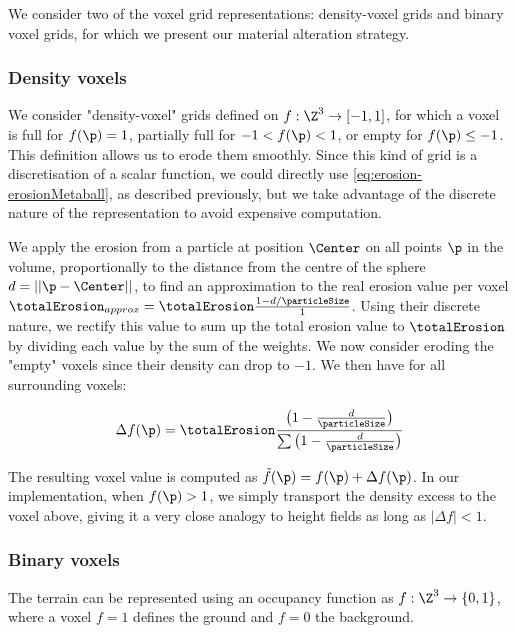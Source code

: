 We consider two of the voxel grid representations: density-voxel grids and binary voxel grids, for which we present our material alteration strategy.

\subsubsection{Density voxels}
\label{sec:erosion-application_on_density_voxels}

We consider "density-voxel" grids defined on $f: \Z^3 \to [-1, 1]$, for which a voxel is full for $f(\p) = 1$, partially full for $-1 < f(\p) < 1$, or empty for $f(\p) \leq -1$.  
This definition allows us to erode them smoothly.  
Since this kind of grid is a discretisation of a scalar function, we could directly use \cref{eq:erosion-erosionMetaball}, as described previously, but we take advantage of the discrete nature of the representation to avoid expensive computation. 

We apply the erosion from a particle at position $\Center$ on all points $\p$ in the volume, proportionally to the distance from the centre of the sphere $d = ||\p - \Center||$, to find an approximation to the real erosion value per voxel $\totalErosion_{approx} = \totalErosion \frac{1 - d/\particleSize}{1}$.  
Using their discrete nature, we rectify this value to sum up the total erosion value to $\totalErosion$ by dividing each value by the sum of the weights. We now consider eroding the "empty" voxels since their density can drop to $-1$. We then have for all surrounding voxels: 

\begin{align}
    \label{eq:erosion-erosionVoxels}
    \Delta f(\p) = \totalErosion \frac{ \big(1 - \frac{d}{\particleSize} \big)}{ \sum \big(1 - \frac{d}{\particleSize}\big)}
\end{align}

The resulting voxel value is computed as $\Tilde{f}(\p) = f(\p) + \Delta f(\p)$.  
In our implementation, when $f(\p) > 1$, we simply transport the density excess to the voxel above, giving it a very close analogy to height fields as long as $|\Delta f| < 1$. 

\subsubsection{Binary voxels}
\label{sec:erosion-application_on_binary_voxels}

The terrain can be represented using an occupancy function as $f: \Z^3 \to \{0, 1\}$, where a voxel $f = 1$ defines the ground and $f = 0$ the background. 

